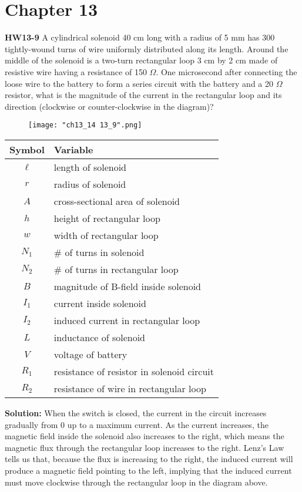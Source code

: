 \documentclass{article}
\newcommand{\marginwidth}{1in}
\begin{document}
\newgeometry{left=\marginwidth,right=\marginwidth,top=\marginwidth,bottom=\marginwidth} %
\fancyhfoffset[O]{0pt}  %
\insertTitle

\section*{Chapter 13}
\textbf{HW13-9} A cylindrical solenoid 40 cm long with a radius of 5 mm has 300 tightly-wound turns of wire uniformly distributed along its length. Around the middle of the solenoid is a two-turn rectangular loop 3 cm by 2 cm made of resistive wire having a resistance of 150 $\Omega$. One microsecond after connecting the loose wire to the battery to form a series circuit with the battery and a 20 $\Omega$ resistor, what is the magnitude of the current in the rectangular loop and its direction (clockwise or counter-clockwise in the diagram)?

\begin{multicols}{2}
\begin{figure}[H]
	\centering
	\texttt{[image: "ch13\_14 13\_9".png]}
\end{figure}

\begin{table}[H]
	\centering
	\begin{tabular}{cl}
		\toprule
		\textbf{Symbol} & \textbf{Variable} \\
		\midrule
		$\ell$ & length of solenoid \\
		$r$ & radius of solenoid \\
		$A$ & cross-sectional area of solenoid \\
		$h$ & height of rectangular loop \\
		$w$ & width of rectangular loop \\
		$N_1$ & \# of turns in solenoid \\
		$N_2$ & \# of turns in rectangular loop \\
		$B$ & magnitude of B-field inside solenoid \\
		$I_1$ & current inside solenoid \\
		$I_2$ & induced current in rectangular loop \\
		$L$ & inductance of solenoid \\
		$V$ & voltage of battery \\
		$R_1$ & resistance of resistor in solenoid circuit \\
		$R_2$ & resistance of wire in rectangular loop \\
		\bottomrule
	\end{tabular}
\end{table}
\end{multicols}
\textbf{Solution:} When the switch is closed, the current in the circuit increases gradually from 0 up to a maximum current. As the current increases, the magnetic field inside the solenoid also increases to the right, which means the magnetic flux through the rectangular loop increases to the right. Lenz's Law tells us that, because the flux is increasing to the right, the induced current will produce a magnetic field pointing to the left, implying that the induced current must move clockwise through the rectangular loop in the diagram above.
\end{document}
